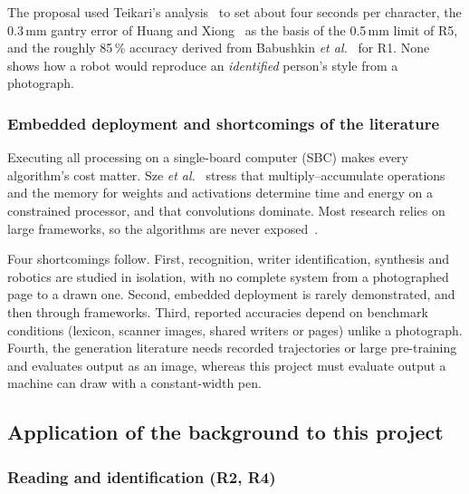 The proposal used Teikari's analysis~\cite{teikari2016} to set about four seconds per character, the 0.3\,mm gantry error of Huang and Xiong~\cite{huang2024} as the basis of the 0.5\,mm limit of R5, and the roughly 85\,\% accuracy derived from Babushkin \emph{et al.}~\cite{babushkin2025} for R1. None shows how a robot would reproduce an \emph{identified} person's style from a photograph.

\subsubsection{Embedded deployment and shortcomings of the literature}
\label{sec:lit-embedded}

Executing all processing on a single-board computer (SBC) makes every algorithm's cost matter. Sze \emph{et al.}~\cite{sze2017} stress that multiply--accumulate operations and the memory for weights and activations determine time and energy on a constrained processor, and that convolutions dominate. Most research relies on large frameworks, so the algorithms are never exposed~\cite{chen2023}.

Four shortcomings follow. First, recognition, writer identification, synthesis and robotics are studied in isolation, with no complete system from a photographed page to a drawn one. Second, embedded deployment is rarely demonstrated, and then through frameworks. Third, reported accuracies depend on benchmark conditions (lexicon, scanner images, shared writers or pages) unlike a photograph. Fourth, the generation literature needs recorded trajectories or large pre-training and evaluates output as an image, whereas this project must evaluate output a machine can draw with a constant-width pen.

\subsection{Application of the background to this project}
\label{sec:lit-application}

\subsubsection{Reading and identification (R2, R4)}

